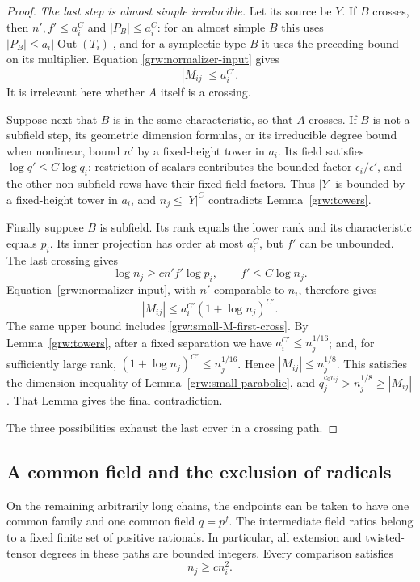 \begin{proof}
\smallskip\noindent
\emph{The last step is almost simple irreducible.}
Let its source be $Y$.  If $B$ crosses, then
$n',f'\le a_i^C$ and $|P_B|\le a_i^C$: for an almost simple $B$ this
uses $|P_B|\le a_i|\operatorname{Out}(T_i)|$, and for a symplectic-type
$B$ it uses the preceding bound on its multiplier.  Equation
\eqref{grw:normalizer-input} gives
\begin{equation}\label{grw:small-M-first-cross}
 |M_{ij}|\le a_i^{C'}.
\end{equation}
It is irrelevant here whether $A$ itself is a crossing.

Suppose next that $B$ is in the same characteristic, so that $A$
crosses.  If $B$ is not a subfield step, its geometric dimension
formulas, or its irreducible degree bound when nonlinear, bound $n'$
by a fixed-height tower in $a_i$.  Its field satisfies
$\log q'\le C\log q_i$: restriction of scalars contributes the
bounded factor $\epsilon_i/\epsilon'$, and the other non-subfield
rows have their fixed field factors.  Thus $|Y|$ is bounded
by a fixed-height tower in $a_i$, and
$n_j\le |Y|^C$ contradicts Lemma~\ref{grw:towers}.

Finally suppose $B$ is subfield.  Its rank equals the lower rank and
its characteristic equals $p_i$.  Its inner projection has order at
most $a_i^C$, but $f'$ can be unbounded.  The last crossing gives
\[
 \log n_j\ge c n' f'\log p_i,
 \qquad f'\le C\log n_j.
\]
Equation~\eqref{grw:normalizer-input}, with $n'$ comparable to $n_i$,
therefore gives
\begin{equation}\label{grw:small-M-subfield}
 |M_{ij}|\le a_i^{C'}(1+\log n_j)^{C'}.
\end{equation}
The same upper bound includes \eqref{grw:small-M-first-cross}.
By Lemma~\ref{grw:towers}, after a fixed separation we have
$a_i^{C'}\le n_j^{1/16}$; and, for sufficiently large rank,
$(1+\log n_j)^{C'}\le n_j^{1/16}$.  Hence
$|M_{ij}|\le n_j^{1/8}$.  This satisfies the dimension inequality of
Lemma~\ref{grw:small-parabolic}, and
$q_j^{c_0n_j}>n_j^{1/8}\ge |M_{ij}|$.  That Lemma gives the final
contradiction.

The three possibilities exhaust the last cover in a crossing path.
\end{proof}

\subsection{A common field and the exclusion of radicals}

\begin{lemma}\label{grw:common-field}
On the remaining arbitrarily long chains, the endpoints can be taken
to have one common family and one common field $q=p^f$.  The intermediate
field ratios belong to a fixed finite set of positive rationals.  In
particular, all extension and twisted-tensor degrees in these paths
are bounded integers.  Every comparison satisfies
\begin{equation}\label{grw:quadratic-growth}
 n_j\ge c n_i^2.
\end{equation}
\end{lemma}

